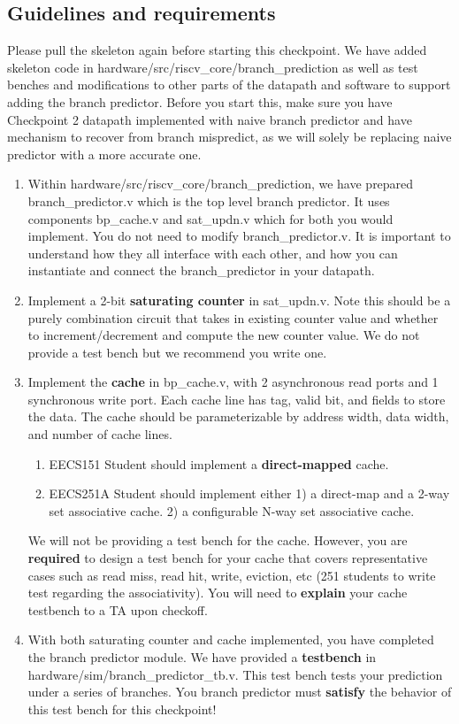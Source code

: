 \documentclass[11pt]{article}
\begin{document}
\subsection{Guidelines and requirements}
Please pull the skeleton again before starting this checkpoint. We have added skeleton code in  hardware/src/riscv\_core/branch\_prediction as well as test benches and modifications to other parts of the datapath and software to support adding the branch predictor. Before you start this, make sure you have Checkpoint 2 datapath implemented with naive branch predictor and have mechanism to recover from branch mispredict, as we will solely be replacing naive predictor with a more accurate one.

\begin{enumerate}
  \item Within hardware/src/riscv\_core/branch\_prediction, we have prepared branch\_predictor.v which is the top level branch predictor. It uses components bp\_cache.v and sat\_updn.v which for both you would implement. You do not need to modify branch\_predictor.v. It is important to understand how they all interface with each other, and how you can instantiate and connect the branch\_predictor in your datapath.
  \item Implement a 2-bit \textbf{saturating counter} in sat\_updn.v. Note this should be a purely combination circuit that takes in existing counter value and whether to increment/decrement and compute the new counter value. We do not provide a test bench but we recommend you write one.
  \item Implement the \textbf{cache} in bp\_cache.v, with 2 asynchronous read ports and 1 synchronous write port. Each cache line has tag, valid bit, and fields to store the data. The cache should be parameterizable by address width, data width, and number of cache lines.
  \begin{enumerate}
      \item EECS151 Student should implement a \textbf{direct-mapped} cache.
      \item EECS251A Student should implement either 1) a direct-map and a 2-way set associative cache. 2) a configurable N-way set associative cache. 
    \end{enumerate}
   We will not be providing a test bench for the cache. However, you are \textbf{required} to design a test bench for your cache that covers representative cases such as read miss, read hit, write, eviction, etc (251 students to write test regarding the associativity). You will need to \textbf{explain} your cache testbench to a TA upon checkoff. 
  \item With both saturating counter and cache implemented, you have completed the branch predictor module. We have provided a \textbf{testbench} in hardware/sim/branch\_predictor\_tb.v. This test bench tests your prediction under a series of branches. You branch predictor must \textbf{satisfy} the behavior of this test bench for this checkpoint!
  

\end{enumerate}
\end{document}
